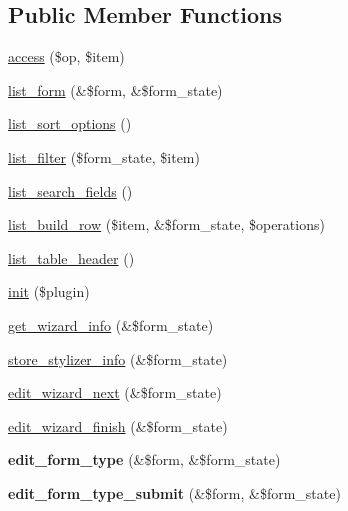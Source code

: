 \subsection*{Public Member Functions}
\begin{DoxyCompactItemize}
\item 
\hyperlink{classstylizer__ui_ae2cd136304d22ed167dcb660f03b2bbf}{access} (\$op, \$item)
\item 
\hyperlink{classstylizer__ui_a9a8b030c4fb9ad963152c8381a76b075}{list\_\-form} (\&\$form, \&\$form\_\-state)
\item 
\hyperlink{classstylizer__ui_a2460301e4fb1ae440fab788b72b1b472}{list\_\-sort\_\-options} ()
\item 
\hyperlink{classstylizer__ui_aa964e50e906437af99898cbc222a3b22}{list\_\-filter} (\$form\_\-state, \$item)
\item 
\hyperlink{classstylizer__ui_ab1ac0677e6a6faf8ec8174366e9097df}{list\_\-search\_\-fields} ()
\item 
\hyperlink{classstylizer__ui_a37d2a02c59128507bb6e811b97de3f06}{list\_\-build\_\-row} (\$item, \&\$form\_\-state, \$operations)
\item 
\hyperlink{classstylizer__ui_ac061b4df53f45a4832bcc133ba9b8d2d}{list\_\-table\_\-header} ()
\item 
\hyperlink{classstylizer__ui_a124bf689e31b67033705f1b5a4bbf40b}{init} (\$plugin)
\item 
\hyperlink{classstylizer__ui_a32963e1d98f25fb218bdfa3270286623}{get\_\-wizard\_\-info} (\&\$form\_\-state)
\item 
\hyperlink{classstylizer__ui_a3d7f33c9c85488dc569f74f01594fe02}{store\_\-stylizer\_\-info} (\&\$form\_\-state)
\item 
\hyperlink{classstylizer__ui_ad4e1744d0df6ea34e5055413af673067}{edit\_\-wizard\_\-next} (\&\$form\_\-state)
\item 
\hyperlink{classstylizer__ui_a1427eae1e6f77718b123dc9d74f335c2}{edit\_\-wizard\_\-finish} (\&\$form\_\-state)
\item 
\hypertarget{classstylizer__ui_a5bd7c6ec20050ef2af02e56c0f91433f}{
{\bfseries edit\_\-form\_\-type} (\&\$form, \&\$form\_\-state)}
\label{classstylizer__ui_a5bd7c6ec20050ef2af02e56c0f91433f}

\item 
\hypertarget{classstylizer__ui_aa551fb9adb35c3982c2e7e940117e6a8}{
{\bfseries edit\_\-form\_\-type\_\-submit} (\&\$form, \&\$form\_\-state)}
\label{classstylizer__ui_aa551fb9adb35c3982c2e7e940117e6a8}

\end{DoxyCompactItemize}


